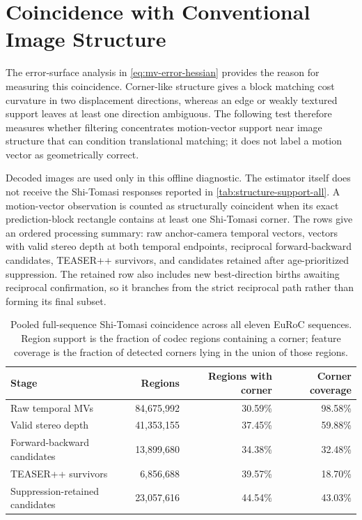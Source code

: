 \section{Coincidence with Conventional Image Structure}

The error-surface analysis in \autoref{eq:mv-error-hessian} provides the reason
for measuring this coincidence. Corner-like structure gives a block matching
cost curvature in two displacement directions, whereas an edge or weakly
textured support leaves at least one direction ambiguous. The following test
therefore measures whether filtering concentrates motion-vector support near
image structure that can condition translational matching; it does not label a
motion vector as geometrically correct.

Decoded images are used only in this offline diagnostic. The estimator itself
does not receive the Shi-Tomasi responses reported in
\autoref{tab:structure-support-all}. A motion-vector observation is counted as
structurally coincident when its exact prediction-block rectangle contains at
least one Shi-Tomasi corner. The rows give an ordered processing summary: raw anchor-camera
temporal vectors, vectors with valid stereo depth at both temporal endpoints,
reciprocal forward-backward candidates, TEASER++ survivors, and candidates
retained after age-prioritized suppression. The retained row also includes new
best-direction births awaiting reciprocal confirmation, so it branches from the
strict reciprocal path rather than forming its final subset.

\begin{table}[htbp]
  \centering
  \caption[Coincidence of codec supports and image corners]{Pooled full-sequence Shi-Tomasi coincidence across all eleven EuRoC
  sequences. Region support is the fraction of codec regions containing a
  corner; feature coverage is the fraction of detected corners lying in the
  union of those regions.}
  \label{tab:structure-support-all}
  \begin{tabular}{@{}lrrr@{}}
    \toprule
    Stage & Regions & Regions with corner & Corner coverage \\
    \midrule
    Raw temporal MVs & 84,675,992 & 30.59\% & 98.58\% \\
    Valid stereo depth & 41,353,155 & 37.45\% & 59.88\% \\
    Forward-backward candidates & 13,899,680 & 34.38\% & 32.48\% \\
    TEASER++ survivors & 6,856,688 & 39.57\% & 18.70\% \\
    Suppression-retained candidates & 23,057,616 & 44.54\% & 43.03\% \\
    \bottomrule
  \end{tabular}
\end{table}


